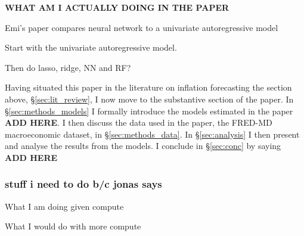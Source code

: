 \textbf{WHAT AM I ACTUALLY DOING IN THE PAPER}

Emi's paper compares neural network to a univariate autoregressive model

Start with the univariate autoregressive model.

Then do lasso, ridge, NN and RF?

Having situated this paper in the literature on inflation forecasting the section above, \S \ref{sec:lit_review}, I now move to the substantive section of the paper. In \S \ref{sec:methods_models} I formally introduce the models estimated in the paper \textbf{ADD HERE}. I then discuss the data used in the paper, the FRED-MD macroeconomic dataset, in \S \ref{sec:methods_data}. In \S \ref{sec:analysis} I then present and analyse the results from the models. I conclude in \S \ref{sec:conc} by saying \textbf{ADD HERE}


\subsubsection{stuff i need to do b/c jonas says}

What I am doing given compute 

What I would do with more compute